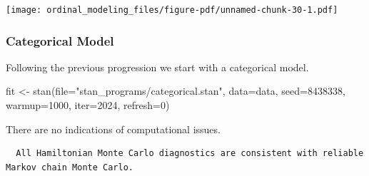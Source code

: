 \documentclass[
  letterpaper,
  DIV=11,
  numbers=noendperiod]{scrartcl}
\newenvironment{Shaded}{\begin{snugshade}}{\end{snugshade}}
\newcommand{\AttributeTok}[1]{\textcolor[rgb]{0.40,0.45,0.13}{#1}}
\newcommand{\ConstantTok}[1]{\textcolor[rgb]{0.56,0.35,0.01}{#1}}
\newcommand{\DecValTok}[1]{\textcolor[rgb]{0.68,0.00,0.00}{#1}}
\newcommand{\FunctionTok}[1]{\textcolor[rgb]{0.28,0.35,0.67}{#1}}
\newcommand{\NormalTok}[1]{\textcolor[rgb]{0.00,0.23,0.31}{#1}}
\newcommand{\OtherTok}[1]{\textcolor[rgb]{0.00,0.23,0.31}{#1}}
\newcommand{\SpecialCharTok}[1]{\textcolor[rgb]{0.37,0.37,0.37}{#1}}
\newcommand{\StringTok}[1]{\textcolor[rgb]{0.13,0.47,0.30}{#1}}
\begin{document}
\texttt{[image: ordinal\_modeling\_files/figure-pdf/unnamed-chunk-30-1.pdf]}

\subsubsection{Categorical Model}\label{categorical-model-1}

Following the previous progression we start with a categorical model.

\begin{Shaded}
\begin{Highlighting}[]
\NormalTok{fit }\OtherTok{\textless{}{-}} \FunctionTok{stan}\NormalTok{(}\AttributeTok{file=}\StringTok{"stan\_programs/categorical.stan"}\NormalTok{,}
            \AttributeTok{data=}\NormalTok{data, }\AttributeTok{seed=}\DecValTok{8438338}\NormalTok{,}
            \AttributeTok{warmup=}\DecValTok{1000}\NormalTok{, }\AttributeTok{iter=}\DecValTok{2024}\NormalTok{, }\AttributeTok{refresh=}\DecValTok{0}\NormalTok{)}
\end{Highlighting}
\end{Shaded}

There are no indications of computational issues.

\begin{Shaded}
\end{Shaded}

\begin{verbatim}
  All Hamiltonian Monte Carlo diagnostics are consistent with reliable
Markov chain Monte Carlo.
\end{verbatim}

\begin{Shaded}
\end{Shaded}
\end{document}
